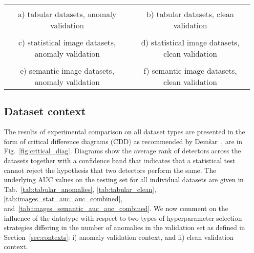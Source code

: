 \begin{figure*}[h]
    \begin{tabular}{c c}
    \resizebox{\columnwidth}{!}{} & \resizebox{\columnwidth}{!}{} \\
    a) tabular datasets, anomaly validation & b) tabular datasets, clean validation \\  
    \resizebox{\columnwidth}{!}{} & \resizebox{\columnwidth}{!}{}\\
    c) statistical image datasets, anomaly validation & d) statistical image  datasets, clean validation \\ 
     \resizebox{\columnwidth}{!}{} & \resizebox{\columnwidth}{!}{} \\
    e) semantic image  datasets, anomaly validation & f) semantic image datasets, clean validation \\
    \end{tabular}
 \caption{Critical difference diagram of models ranked via the test AUC. Models whose performance is statistically indistinguishable have a difference of ranks under the critical value of the Nemenyi test $CD_{0.1}$ and are joined by a horizontal band. Results are presented for different types of datasets: tabular (Top row), image datasets with statistical anomalies (Middle row), and image datasets with semantic anomalies (Bottom row); and two different hyperparameter selection cases: using anomalies in validation (left) and using clean validation (right).
 }
 \label{fig:critical_diag}
\end{figure*}

\subsection{Dataset context}
\label{sec:dataset_context}
The results of experimental comparison on all dataset types are presented in the form of critical difference diagrams (CDD) as recommended by Dem\v{s}ar~\cite{demvsar2006statistical}, are in Fig.~\ref{fig:critical_diag}. Diagrams show the average rank of detectors across the datasets together with a confidence band that indicates that a statistical test cannot reject the hypothesis that two detectors perform the same. The underlying  AUC values on the testing set for all individual datasets are given in Tab.~\ref{tab:tabular_anomalies}, \ref{tab:tabular_clean}, \ref{tab:images_stat_auc_auc_combined}, and~\ref{tab:images_semantic_auc_auc_combined}. We now comment on the influence of the datatype with respect to two types of hyperparameter selection strategies differing in the number of anomalies in the validation set as defined in Section~\ref{sec:contexts}: i) anomaly validation context, and ii) clean validation context.

